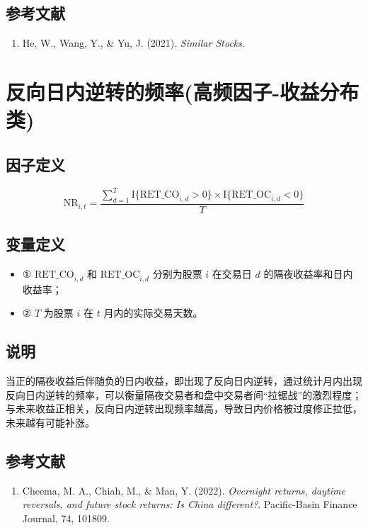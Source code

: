 \documentclass{article}
\begin{document}
\subsection{参考文献}
\begin{enumerate}
    \item He, W., Wang, Y., \& Yu, J. (2021). \textit{Similar Stocks}.
\end{enumerate}

\section{反向日内逆转的频率(高频因子-收益分布类)}

\subsection{因子定义}
\begin{equation}
    \mathrm{NR}_{i,t} = \frac{\sum_{d=1}^{T} \mathrm{I}\{\mathrm{RET\_CO}_{i,d}>0\} \times \mathrm{I}\{\mathrm{RET\_OC}_{i,d}<0\}}{T}
\end{equation}

\subsection{变量定义}
\begin{itemize}
    \item ① \( \mathrm{RET\_CO}_{i,d} \) 和 \( \mathrm{RET\_OC}_{i,d} \) 分别为股票 \( i \) 在交易日 \( d \) 的隔夜收益率和日内收益率；
    \item ② \( T \) 为股票 \( i \) 在 \( t \) 月内的实际交易天数。
\end{itemize}

\subsection{说明}
当正的隔夜收益后伴随负的日内收益，即出现了反向日内逆转，通过统计月内出现反向日内逆转的频率，可以衡量隔夜交易者和盘中交易者间“拉锯战”的激烈程度；与未来收益正相关，反向日内逆转出现频率越高，导致日内价格被过度修正拉低，未来越有可能补涨。

\subsection{参考文献}
\begin{enumerate}
    \item Cheema, M. A., Chiah, M., \& Man, Y. (2022). \textit{Overnight returns, daytime reversals, and future stock returns: Is China different?}. Pacific-Basin Finance Journal, 74, 101809.
\end{enumerate}
\end{document}
